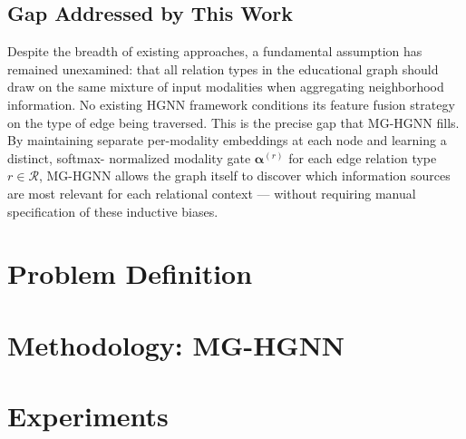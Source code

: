 \documentclass[sigconf]{acmart}
\begin{document}
\subsection{Gap Addressed by This Work}

Despite the breadth of existing approaches, a fundamental assumption has remained
unexamined: that all relation types in the educational graph should draw on the
same mixture of input modalities when aggregating neighborhood information. No
existing HGNN framework conditions its feature fusion strategy on the type of
edge being traversed. This is the precise gap that MG-HGNN fills. By maintaining
separate per-modality embeddings at each node and learning a distinct, softmax-
normalized modality gate $\boldsymbol{\alpha}^{(r)}$ for each edge relation type
$r \in \mathcal{R}$, MG-HGNN allows the graph itself to discover which
information sources are most relevant for each relational context --- without
requiring manual specification of these inductive biases.

\section{Problem Definition}
\label{sec:problem}
\lipsum[1]

\section{Methodology: MG-HGNN}
\label{sec:method}
\lipsum[1-2]

\section{Experiments}
\label{sec:experiments}
\lipsum[1]

\end{document}

